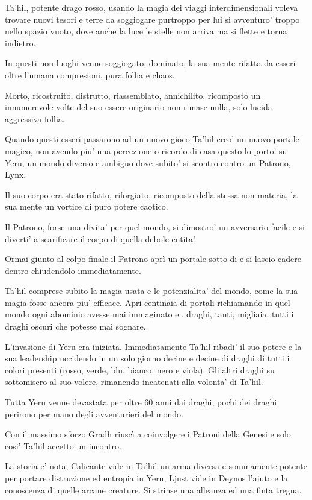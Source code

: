 \documentclass[a4paper,11pt,twoside,openany]{book}
\begin{document}
Ta'hil, potente drago rosso, usando la magia dei viaggi interdimensionali voleva trovare nuovi tesori e terre da soggiogare purtroppo per lui si avventuro' troppo nello spazio vuoto, dove anche la luce le stelle non arriva ma si flette e torna indietro.

In questi non luoghi venne soggiogato, dominato, la sua mente rifatta da esseri oltre l'umana compresioni, pura follia e chaos.

Morto, ricostruito, distrutto, riassemblato, annichilito, ricomposto un innumerevole volte del suo essere originario non rimase nulla, solo lucida aggressiva follia.

Quando questi esseri passarono ad un nuovo gioco Ta'hil creo' un nuovo portale magico, non avendo piu' una percezione o ricordo di casa questo lo porto' su Yeru, un mondo diverso e ambiguo dove subito' si scontro contro un Patrono, Lynx.

Il suo corpo era stato rifatto, riforgiato, ricomposto della stessa non materia, la sua mente un vortice di puro potere caotico.

Il Patrono, forse una divita' per quel mondo, si dimostro' un avversario facile e si diverti' a scarificare il corpo di quella debole entita'.

Ormai giunto al colpo finale il Patrono aprì un portale sotto di e si lascio cadere dentro chiudendolo immediatamente.

Ta'hil comprese subito la magia usata e le potenzialita' del mondo, come la sua magia fosse ancora piu' efficace.
Apri centinaia di portali richiamando in quel mondo ogni abominio avesse mai immaginato e.. draghi, tanti, migliaia, tutti i draghi oscuri che potesse mai sognare.

L'invasione di Yeru era iniziata. Immediatamente Ta'hil ribadi' il suo potere e la sua leadership uccidendo in un solo giorno decine e decine di draghi di tutti i colori presenti (rosso, verde, blu, bianco, nero e viola).
Gli altri draghi su sottomisero al suo volere, rimanendo incatenati alla volonta' di Ta'hil.

Tutta Yeru venne devastata per oltre 60 anni dai draghi, pochi dei draghi perirono per mano degli avventurieri del mondo.

Con il massimo sforzo Gradh riuscì a coinvolgere i Patroni della Genesi e solo cosi' Ta'hil accetto un incontro.

La storia e' nota, Calicante vide in Ta'hil un arma diversa e sommamente potente per portare distruzione ed entropia in Yeru, Ljust vide in Deynos l'aiuto e la conoscenza di quelle arcane creature.
Si strinse una alleanza ed una finta tregua.
\end{document}
